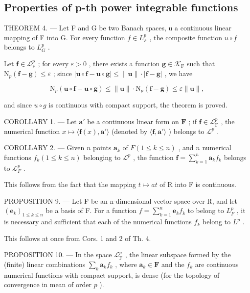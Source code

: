 \subsection{Properties of p-th power integrable functions}

THEOREM 4. --- Let F and G be two Banach spaces, u a continuous linear mapping of F into G. For every function \(f \in L_{F}^{p}\) , the composite function \(u \circ f\) belongs to \(L_{G}^{p}\) .

Let \(\mathbf{f} \in \mathcal{L}_{\mathrm{F}}^{p}\) ; for every \(\varepsilon > 0\) , there exists a function \(\mathbf{g} \in \mathcal{K}_{\mathrm{F}}\) such that \(\mathrm{N}_p(\mathbf{f} - \mathbf{g}) \leqslant \varepsilon\) ; since \(|\mathbf{u} \circ \mathbf{f} - \mathbf{u} \circ \mathbf{g}| \leqslant \| \mathbf{u} \| \cdot |\mathbf{f} - \mathbf{g}|\) , we have

\[
\mathrm{N} _ {p} (\mathbf {u} \circ \mathbf {f} - \mathbf {u} \circ \mathbf {g}) \leqslant \| \mathbf {u} \| \cdot \mathrm{N} _ {p} (\mathbf {f} - \mathbf {g}) \leqslant \varepsilon \| \mathbf {u} \|,
\]

and since \(u \circ g\) is continuous with compact support, the theorem is proved.

COROLLARY 1. --- Let \(\mathbf{a}'\) be a continuous linear form on \(\mathbf{F}\) ; if \(\mathbf{f} \in \mathcal{L}_{\mathrm{F}}^{p}\) , the numerical function \(x \mapsto \langle \mathbf{f}(x), \mathbf{a}' \rangle\) (denoted by \(\langle \mathbf{f}, \mathbf{a}' \rangle\) ) belongs to \(\mathcal{L}^p\) .

COROLLARY 2. --- Given \(n\) points \(\mathbf{a}_k\) of \(F (1 \leqslant k \leqslant n)\) , and \(n\) numerical functions \(f_k (1 \leqslant k \leqslant n)\) belonging to \(\mathcal{L}^p\) , the function \(\mathbf{f} = \sum_{k=1}^{n} \mathbf{a}_k f_k\) belongs to \(\mathcal{L}_F^p\) .

This follows from the fact that the mapping \(t \mapsto at\) of R into F is continuous.

PROPOSITION 9. --- Let F be an n-dimensional vector space over R, and let \((\mathbf{e}_{k})_{1\leqslant k\leqslant n}\) be a basis of F. For a function \(f=\sum_{k=1}^{n}\mathbf{e}_{k}f_{k}\) to belong to \(L_{F}^{p}\) , it is necessary and sufficient that each of the numerical functions \(f_{k}\) belong to \(L^{p}\) .

This follows at once from Cors. 1 and 2 of Th. 4.

PROPOSITION 10. --- In the space \(\mathcal{L}_{\mathrm{F}}^{p}\) , the linear subspace formed by the (finite) linear combinations \(\sum_{k} \mathbf{a}_{k} f_{k}\) , where \(\mathbf{a}_{k} \in \mathbf{F}\) and the \(f_{k}\) are continuous numerical functions with compact support, is dense (for the topology of convergence in mean of order \(p\) ).

